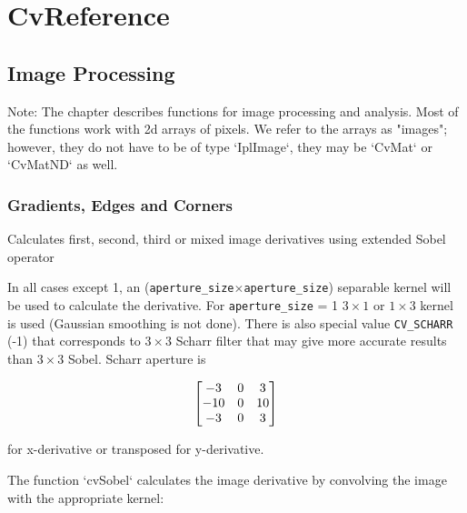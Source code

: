 \chapter{CvReference}
\section{Image Processing}
Note: The chapter describes functions for image processing and analysis. Most of the functions work with 2d arrays of pixels. We refer to the arrays as "images"; however, they do not have to be of type `IplImage`, they may be `CvMat` or `CvMatND` as well.

\subsection{Gradients, Edges and Corners}

\label{Sobel}
\label{Sobel}
Calculates first, second, third or mixed image derivatives using extended Sobel operator

\begin{description}
\end{description}

In all cases except 1, an (\texttt{aperture\_size}$\times$\texttt{aperture\_size}) separable kernel will be used to calculate the derivative. For \texttt{aperture\_size} = 1 $3\times1$ or $1\times3$ kernel is used (Gaussian smoothing is not done). There is also special value \texttt{CV\_SCHARR} (-1) that corresponds to $3\times3$ Scharr filter that may give more accurate results than $3\times3$ Sobel. Scharr aperture is

\[ \begin{bmatrix} -3 & 0 & 3\\ -10 & 0 & 10\\ -3 & 0 & 3 \end{bmatrix}
\]

for x-derivative or transposed for y-derivative.

The function `cvSobel` calculates the image derivative by convolving the image with the appropriate kernel:

